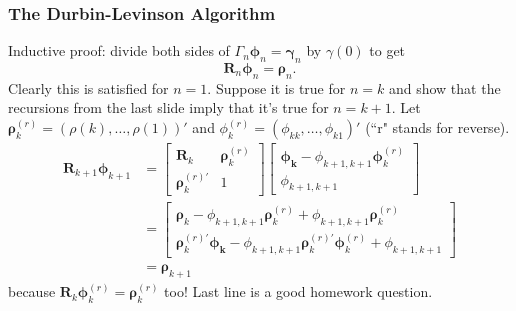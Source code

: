 \documentclass{beamer}
\begin{document}
\begin{frame}
\frametitle{The Durbin-Levinson Algorithm}

Inductive proof: divide both sides of $ \Gamma_n \bm{\phi}_n = \bm{\gamma}_n$ by $\gamma(0)$ to get
\[
\mathbf{R}_n \bm{\phi}_n = \bm{\rho}_n.
\]
Clearly this is satisfied for $n=1$. Suppose it is true for $n=k$ and show that the recursions from the last slide  imply that it's true for $n=k+1$. Let $\bm{\rho}_k^{(r)} = (\rho(k),\ldots,\rho(1))'$ and $\phi_k^{(r)} = (\phi_{kk},\ldots,\phi_{k1} )'$ (``r" stands for reverse).
\begin{align*}
\mathbf{R}_{k+1} \bm{\phi}_{k+1} &= 
\left[ \begin{array}{cc}
\mathbf{R}_k & \bm{\rho}_k^{(r)} \\
\bm{\rho}^{(r)'}_k   & 1
\end{array}\right]
\left[ \begin{array}{c}
\bm{\phi_k} - \phi_{k+1,k+1} \bm{\phi}_k^{(r)} \\
\phi_{k+1,k+1}
\end{array}\right] \\
&= 
\left[ \begin{array}{c}
\bm{\rho}_k - \phi_{k+1,k+1}\bm{\rho}_k^{(r)} + \phi_{k+1,k+1}\bm{\rho}_k^{(r)} \\
\bm{\rho}_k^{(r)'}\bm{\phi_k} - \phi_{k+1,k+1}\bm{\rho}_k^{(r)'}\bm{\phi}_k^{(r)} + \phi_{k+1,k+1}
\end{array}\right] \\
&= \bm{\rho}_{k+1}
\end{align*}
because $\mathbf{R}_k \bm{\phi}_k^{(r)} = \bm{\rho}_k^{(r)}$ too! Last line is a good homework question.
\end{frame}

\end{document}
